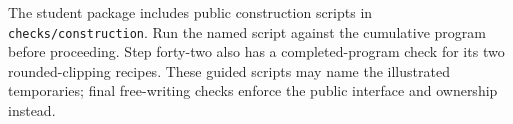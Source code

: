 The student package includes public construction scripts in
\texttt{checks/construction}. Run the named script against the cumulative program
before proceeding. Step forty-two also has a completed-program check for its two
rounded-clipping recipes. These guided scripts may name the illustrated temporaries;
final free-writing checks enforce the public interface and ownership instead.

